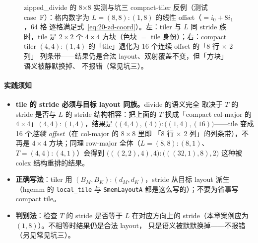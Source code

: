 \begin{figure}[H]
\caption{zipped\_divide 的 8$\times$8 实测与坑三 compact-tiler 反例（测试
case~F）：格内数字为 $L=(8,8){:}(1,8)$ 的线性 offset（$=i_0+8i_1$，64 格
逐格满足式~\eqref{eq:20-zd-coord}）。左：tiler 与 $L$ 同 stride 族时，tile
是 $2\times2$ 个 $4\times4$ 方块（色块 $=$ tile 身份）；右：compact tiler
$(4,4){:}(1,4)$ 的「tile」退化为 16 个连续 offset 的「8 行 $\times$ 2 列」
列条带——结果仍是合法 layout、双射覆盖不变，但「方块」语义被静默换掉、
不报错（常见坑三）。}
\label{fig:20-zd-tile-shape}
\end{figure}

\paragraph{实践须知}
\begin{itemize}
  \item \textbf{tile 的 stride 必须与目标 layout 同族。}\allowbreak{}divide 的语义完全
        取决于 $T$ 的 stride 是否与 $L$ 的 stride 结构相容：把上面的 $T$
        换成「compact col-major 的 $4\times4$」$(4,4){:}(1,4)$，结果是
        $\bigl((4,4),(4)\bigr){:}\bigl((1,4),(16)\bigr)$——tile 变成
        16 个\emph{连续 offset}（在 col-major 的 $8\times8$ 里即
        「8 行 $\times$ 2 列」的列条带），不再是 $4\times4$ 方块；同理
        row-major 全体（$L=(8,8){:}(8,1)$、$T=(4,4){:}(4,1)$）会得到
        $\bigl(((2,2),4),4\bigr){:}\bigl(((32,1),8),2\bigr)$ 这种被 colex
        结构重排的结果。
  \item \textbf{正确写法}：tiler 用 $(B_M,B_K){:}(d_M,d_K)$，stride 从目标
        layout 派生（hgemm 的 \texttt{local\_tile} 与 \texttt{SmemLayoutA}
        都是这么写的）；不要为省事写 compact tile。
  \item \textbf{判别法}：检查 $T$ 的 stride 是否等于 $L$ 在对应方向上的
        stride（本章案例应为 $(1,8)$）。不相等时结果仍是合法 layout，
        只是语义被默默换掉——不报错（另见常见坑三）。
\end{itemize}

